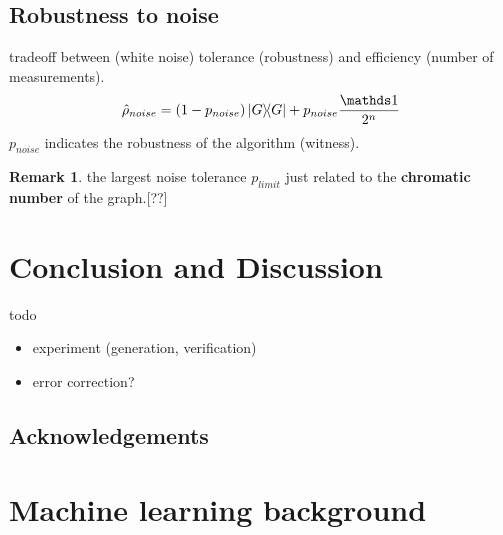 \documentclass[
aps,
pra,
linenumbers,
floatfix,
]{revtex4-2}
\theoremstyle{plain}
\theoremstyle{definition}
\newtheorem{remark}{Remark}
\newcommand{\dm}{\hat{\rho}}
\begin{document}
\subsection{Robustness to noise}
tradeoff between (white noise) tolerance (robustness) and efficiency (number of measurements).
\begin{equation}
	\dm_{noise} = (1-p_{noise}) \op{G} + p_{noise} \frac{\identity}{2^n}
\end{equation}
$p_{noise}$ indicates the robustness of the algorithm (witness).
\begin{remark}
	the largest noise tolerance $p_{limit}$ just related to the \textbf{chromatic number} of the graph.[??]
\end{remark}
% 
% 

\section{Conclusion and Discussion}
todo
\begin{itemize}
	\item experiment (generation, verification) \cite{luEntanglementStructureEntanglement2018}
	\item error correction?
\end{itemize}

\subsection*{Acknowledgements}



%


\onecolumngrid
\appendix

\section{Machine learning background}

\end{document}
